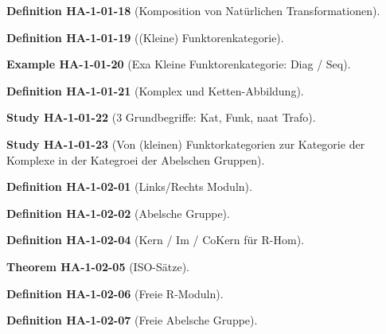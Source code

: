 \documentclass[10pt, letterpaper]{article}
\newcommand{\CustomHeading}[3]{%
  \par\medskip\noindent%
  \textbf{#1 #2} \textnormal{(#3)}.\enskip%
}
\newenvironment{DEF}[2]{\CustomHeading{Definition}{#1}{#2}}{}
\newenvironment{THEO}[2]{\CustomHeading{Theorem}{#1}{#2}}{}
\newenvironment{EXA}[2]{\CustomHeading{Example}{#1}{#2}}{}
\newenvironment{STUD}[2]{\CustomHeading{Study}{#1}{#2}}{}
\begin{document}
\begin{DEF}{HA-1-01-18}{Komposition von Natürlichen Transformationen}
\end{DEF}

\begin{DEF}{HA-1-01-19}{(Kleine) Funktorenkategorie}
\end{DEF}

\begin{EXA}{HA-1-01-20}{Exa Kleine Funktorenkategorie: Diag / Seq}
\end{EXA}

\begin{DEF}{HA-1-01-21}{Komplex und Ketten-Abbildung}
\end{DEF}

\begin{STUD}{HA-1-01-22}{3 Grundbegriffe: Kat, Funk, naat Trafo}
\end{STUD}

\begin{STUD}{HA-1-01-23}{Von (kleinen) Funktorkategorien zur Kategorie der Komplexe in der Kategroei der Abelschen Gruppen}
\end{STUD}

\begin{DEF}{HA-1-02-01}{Links/Rechts Moduln}
\end{DEF}

\begin{DEF}{HA-1-02-02}{Abelsche Gruppe}
\end{DEF}

\begin{DEF}{HA-1-02-04}{Kern / Im / CoKern für R-Hom}
\end{DEF}

\begin{THEO}{HA-1-02-05}{ISO-Sätze}
\end{THEO}

\begin{DEF}{HA-1-02-06}{Freie R-Moduln}
\end{DEF}

\begin{DEF}{HA-1-02-07}{Freie Abelsche Gruppe}
\end{DEF}
\end{document}
